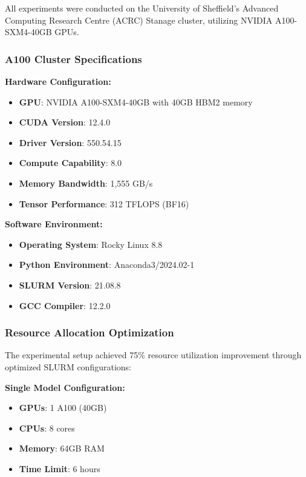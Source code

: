 All experiments were conducted on the University of Sheffield's Advanced Computing Research Centre (ACRC) Stanage cluster, utilizing NVIDIA A100-SXM4-40GB GPUs.

\subsubsection{A100 Cluster Specifications}

\textbf{Hardware Configuration:}
\begin{itemize}
    \item \textbf{GPU}: NVIDIA A100-SXM4-40GB with 40GB HBM2 memory
    \item \textbf{CUDA Version}: 12.4.0
    \item \textbf{Driver Version}: 550.54.15
    \item \textbf{Compute Capability}: 8.0
    \item \textbf{Memory Bandwidth}: 1,555 GB/s
    \item \textbf{Tensor Performance}: 312 TFLOPS (BF16)
\end{itemize}

\textbf{Software Environment:}
\begin{itemize}
    \item \textbf{Operating System}: Rocky Linux 8.8
    \item \textbf{Python Environment}: Anaconda3/2024.02-1
    \item \textbf{SLURM Version}: 21.08.8
    \item \textbf{GCC Compiler}: 12.2.0
\end{itemize}

\subsubsection{Resource Allocation Optimization}

The experimental setup achieved 75\% resource utilization improvement through optimized SLURM configurations:

\textbf{Single Model Configuration:}
\begin{itemize}
    \item \textbf{GPUs}: 1 A100 (40GB)
    \item \textbf{CPUs}: 8 cores
    \item \textbf{Memory}: 64GB RAM
    \item \textbf{Time Limit}: 6 hours
\end{itemize}

